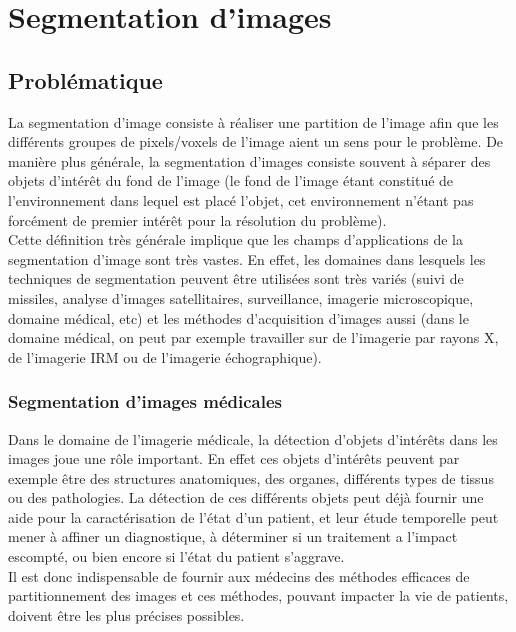 \section{Segmentation d'images}

\subsection{Problématique}
La segmentation d'image consiste à réaliser une partition de l'image afin que les différents groupes de pixels/voxels de l'image aient un sens pour le problème. De manière plus générale, la segmentation d'images consiste souvent à séparer des objets d'intérêt du fond de l'image (le fond de l'image étant constitué de l'environnement dans lequel est placé l'objet, cet environnement n'étant pas forcément de premier intérêt pour la résolution du problème).\\

Cette définition très générale implique que les champs d'applications de la segmentation d'image sont très vastes. En effet, les domaines dans lesquels les techniques de segmentation peuvent être utilisées sont très variés (suivi de missiles, analyse d'images satellitaires, surveillance, imagerie microscopique, domaine médical, etc) et les méthodes d'acquisition d'images aussi (dans le domaine médical, on peut par exemple travailler sur de l'imagerie par rayons X, de l'imagerie IRM ou de l'imagerie échographique).

\subsubsection*{Segmentation d'images médicales}

Dans le domaine de l'imagerie médicale, la détection d'objets d'intérêts dans les images joue une rôle important. En effet ces objets d'intérêts peuvent par exemple être des structures anatomiques, des organes, différents types de tissus ou des pathologies. La détection de ces différents objets peut déjà fournir une aide pour la caractérisation de l'état d'un patient, et leur étude temporelle peut mener à affiner un diagnostique, à déterminer si un traitement a l'impact escompté, ou bien encore si l'état du patient s'aggrave.\\

Il est donc indispensable de fournir aux médecins des méthodes efficaces de partitionnement des images et ces méthodes, pouvant impacter la vie de patients, doivent être les plus précises possibles.\\

